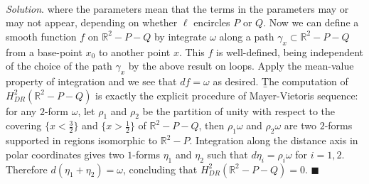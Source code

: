 \documentclass[11pt, a3paper, openany]{article}
\theoremstyle{remark}
\theoremstyle{remark}
\theoremstyle{remark}
\newenvironment{Proof of claim}
  {\begin{proof}[\normalfont \textbf{Proof of claim}]}
  {\end{proof}}
\newenvironment{Soln}{\vspace{4pt}\textbf{\\}{\color{red}\textit{Solution}}.\normalfont}{\color{red}\hfill$\blacksquare$\vspace{4pt}\par}	%
\theoremstyle{definition}
\theoremstyle{remark}
\theoremstyle{plain}
\begin{document}
\begin{exercise}{}{}
\begin{Soln}
where the parameters mean that the terms in the parameters may or may not appear, depending on whether $\ell$ encircles $P$ or $Q$. Now we can define a smooth function $f$ on $\mathbb{R}^2-P-Q$ by integrate $\omega$ along a path $\gamma_x\subset \mathbb{R}^2-P-Q$ from a base-point $x_0$ to another point $x$. This $f$ is well-defined, being independent of the choice of the path $\gamma_x$ by the above result on loops. Apply the mean-value property of integration and we see that $df=\omega$ as desired.
\b
The computation of $H_{DR}^2(\mathbb{R}^2-P-Q)$ is exactly the explicit procedure of Mayer-Vietoris sequence: for any $2$-form $\omega$, let $\rho_1$ and $\rho_2$ be the partition of unity with respect to the covering $\{x<\frac{3}{2} \}$ and $\{x>\frac{1}{2}\}$ of $\mathbb{R}^2-P-Q $, then $\rho_1\omega$ and $\rho_2\omega$ are two $2$-forms supported in regions isomorphic to $\mathbb{R}^2-P$. Integration along the distance axis in polar coordinates gives two $1$-forms $\eta_1$ and $\eta_2$ such that $d\eta_i= \rho_i\omega$ for $i=1,2$. Therefore $d(\eta_1+\eta_2)=\omega$, concluding that $H_{DR}^2(\mathbb{R}^2-P-Q)=0$. 
\end{Soln}
\end{exercise}
\end{document}
